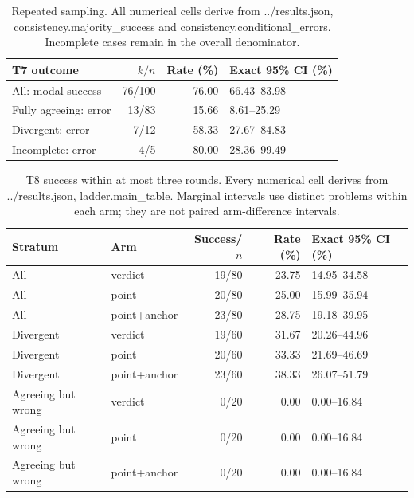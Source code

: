 \begin{table}[t]
\centering\small
\begin{tabular}{lrrl}
\hline
T7 outcome & $k/n$ & Rate (\%) & Exact 95\% CI (\%) \\
\hline
All: modal success & 76/100 & 76.00 & 66.43--83.98 \\
Fully agreeing: error & 13/83 & 15.66 & 8.61--25.29 \\
Divergent: error & 7/12 & 58.33 & 27.67--84.83 \\
Incomplete: error & 4/5 & 80.00 & 28.36--99.49 \\
\hline
\end{tabular}
\caption{Repeated sampling. All numerical cells derive from ../results.json, consistency.majority\_success and consistency.conditional\_errors. Incomplete cases remain in the overall denominator.}
\label{tab:consistency}
\end{table}
\begin{table}[t]
\centering\small
\begin{tabular}{llrrl}
\hline
Stratum & Arm & Success/$n$ & Rate (\%) & Exact 95\% CI (\%) \\
\hline
All & verdict & 19/80 & 23.75 & 14.95--34.58 \\
All & point & 20/80 & 25.00 & 15.99--35.94 \\
All & point+anchor & 23/80 & 28.75 & 19.18--39.95 \\
Divergent & verdict & 19/60 & 31.67 & 20.26--44.96 \\
Divergent & point & 20/60 & 33.33 & 21.69--46.69 \\
Divergent & point+anchor & 23/60 & 38.33 & 26.07--51.79 \\
Agreeing but wrong & verdict & 0/20 & 0.00 & 0.00--16.84 \\
Agreeing but wrong & point & 0/20 & 0.00 & 0.00--16.84 \\
Agreeing but wrong & point+anchor & 0/20 & 0.00 & 0.00--16.84 \\
\hline
\end{tabular}
\caption{T8 success within at most three rounds. Every numerical cell derives from ../results.json, ladder.main\_table. Marginal intervals use distinct problems within each arm; they are not paired arm-difference intervals.}
\label{tab:ladder}
\end{table}
